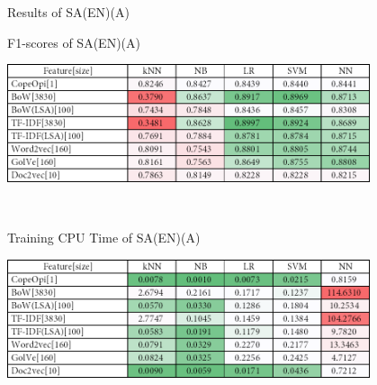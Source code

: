 \caption{Results of SA(EN)(A)}
\label{tab:sa_en_a}
\centering
\begin{subtable}{\textwidth}
	\centering
	\caption{F1-scores of SA(EN)(A)}
	\includegraphics[width=0.8\textwidth]{./figure/01A1.png}
\end{subtable}\\[1em]
\begin{subtable}{\textwidth}
	\centering
	\caption{Training CPU Time of SA(EN)(A)}
	\includegraphics[width=0.8\textwidth]{./figure/01A1t.png}
\end{subtable}
